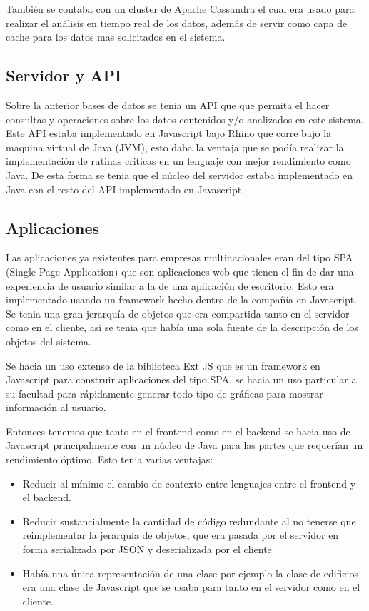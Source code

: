 \documentclass{book}
\begin{document}
También se contaba con un cluster de Apache Cassandra el cual era usado
para realizar el análisis en tiempo real de los datos, además de servir
como capa de cache para los datos mas solicitados en el sistema.

\subsection{Servidor y API}
Sobre la anterior bases de datos se tenia un API que que permita el
hacer consultas y operaciones sobre los datos contenidos y/o analizados
en este sistema. Este API estaba implementado en Javascript bajo Rhino
que corre bajo la maquina virtual de Java (JVM), esto daba la ventaja
que se podía realizar la implementación de rutinas criticas en un
lenguaje con mejor rendimiento como Java. De esta forma se tenia que el
núcleo del servidor estaba implementado en Java con el resto del API
implementado en Javascript.

\subsection{Aplicaciones}
Las aplicaciones ya existentes para empresas multinacionales eran del tipo
SPA (Single Page Application) que son aplicaciones web que tienen el fin
de dar una experiencia de usuario similar a la de una aplicación de escritorio.
Esto era implementado usando un framework hecho dentro de la compañía
en Javascript. Se tenia una gran jerarquía de objetos que era
compartida tanto en el servidor como en el cliente, así se tenia que
había una sola fuente de la descripción de los objetos del sistema.

Se hacia un uso extenso de la biblioteca Ext JS que es un framework
en Javascript para construir aplicaciones del tipo SPA, se hacia un uso particular
a su facultad para rápidamente generar todo tipo de gráficas para mostrar
información al usuario.

Entonces tenemos que tanto en el frontend como en el backend se hacia
uso de Javascript principalmente con un núcleo de Java para las partes
que requerían un rendimiento óptimo. Esto tenia varias ventajas:

\begin{itemize}
\item Reducir al mínimo el cambio de contexto entre lenguajes entre
  el frontend y el backend.
\item Reducir sustancialmente la cantidad de código redundante al no
  tenerse que reimplementar la jerarquía de objetos, que era pasada
  por el servidor en forma serializada por JSON y deserializada por el
  cliente
\item Había una única representación de una clase por ejemplo la
  clase de edificios era una clase de Javascript que se usaba para
  tanto en el servidor como en el cliente.
\end{itemize}
\end{document}

